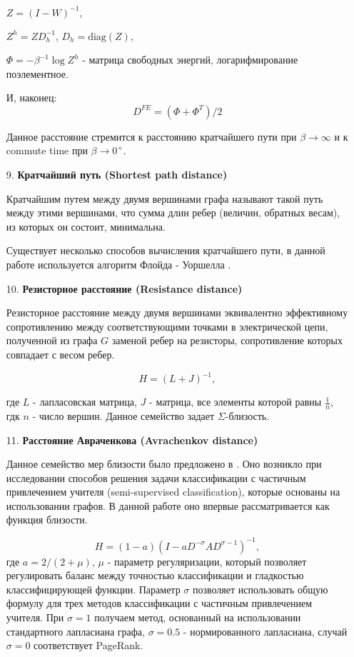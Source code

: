 \begin{itemize}
$Z = (I-W)^{-1},$

$Z^h = ZD_h^{-1}$, $D_h = \text{diag}(Z),$

$\Phi = -\beta^{-1} \log Z^h$ - матрица свободных энергий, логарифмирование поэлементное.

И, наконец:
\begin{equation}
D^{FE} = (\Phi + \Phi ^T)/ 2
\end{equation}

Данное расстояние стремится к расстоянию кратчайшего пути при $\beta \rightarrow \infty$ и к commute time при $\beta \rightarrow 0^+$.

\item[9.] \textbf{Кратчайший путь (Shortest path distance)}

Кратчайшим путем между двумя вершинами графа называют такой путь между этими вершинами, что сумма длин ребер (величин, обратных весам), из которых он состоит, минимальна.

Существует несколько способов вычисления кратчайшего пути, в данной работе используется алгоритм Флойда - Уоршелла \cite{floyd1962algorithm}.

\item[10.] \textbf{Резисторное расстояние (Resistance distance)}

Резисторное расстояние между двумя вершинами эквивалентно эффективному сопротивлению между соответствующими точками в электрической цепи, полученной из графа $G$ заменой ребер на резисторы, сопротивление которых совпадает с весом ребер. 

\begin{equation}
H = (L + J)^{-1},
\end{equation}
 
где $L$ - лапласовская матрица, $J$ - матрица, все элементы которой равны $\frac {1}{n}$, гдк $n$ - число вершин. Данное семейство задает $\Sigma$-близость.

\item[11.] \textbf{Расстояние Авраченкова (Avrachenkov distance)}

Данное семейство мер близости было предложено в \cite{avrachenkov2012generalized}. Оно возникло при исследовании способов решения задачи классификации с частичным привлечением учителя (semi-supervised classification), которые основаны на использовании графов. В данной работе оно впервые рассматривается как функция близости.

\begin{equation}
H = (1 - a)(I - aD^{-\sigma}AD^{\sigma-1})^{-1},
\end{equation}
где $a = 2/(2+\mu)$,  $\mu$ - параметр регуляризации, который позволяет регулировать баланс между точностью классификации и гладкостью классифицирующей функции. Параметр 
$\sigma$ позволяет использовать общую формулу для трех методов классификации с частичным привлечением учителя. При $\sigma = 1$ получаем метод, основанный на использовании стандартного лапласиана графа, $\sigma = 0.5$ - нормированного лапласиана,  случай $\sigma = 0$ соответствует PageRank.


\end{itemize}
